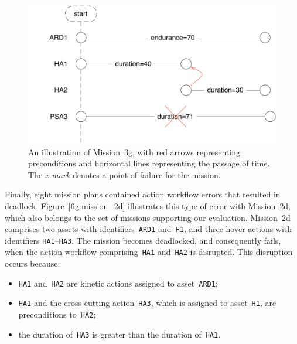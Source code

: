 \begin{figure}[ht]
\centering
\includegraphics[scale=0.58]{img/mission-3g.pdf}
\caption[Mission 3g]{An illustration of Mission~3g, with red arrows representing preconditions and horizontal lines representing the passage of time. The \emph{x mark} denotes a point of failure for the mission.}
\label{fig:mission_3g}
\end{figure}

Finally, eight mission plans contained action workflow errors that resulted in deadlock. Figure~\ref{fig:mission_2d} illustrates this type of error with Mission~2d, which also belongs to the set of missions supporting our evaluation. Mission~2d comprises two assets with identifiers~\texttt{ARD1} and~\texttt{H1}, and three hover actions with identifiers \texttt{HA1}--\texttt{HA3}. The mission becomes deadlocked, and consequently fails, when the action workflow comprising~\texttt{HA1} and~\texttt{HA2} is disrupted. This disruption occurs because:

\begin{itemize}

\item \texttt{HA1} and~\texttt{HA2} are kinetic actions assigned to asset~\texttt{ARD1};

\item \texttt{HA1} and the cross-cutting action~\texttt{HA3}, which is assigned to asset~\texttt{H1}, are preconditions to~\texttt{HA2};

\item the duration of~\texttt{HA3} is greater than the duration of~\texttt{HA1}.

\end{itemize}

